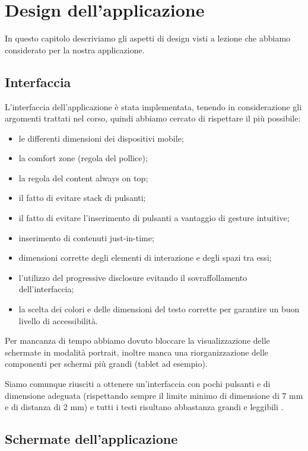 \chapter{Design dell'applicazione\label{sec:design}}

In questo capitolo descriviamo gli aspetti di design visti a lezione che abbiamo considerato per la nostra applicazione.

\section{Interfaccia\label{sec:interfaccia}}
L'interfaccia dell'applicazione è stata implementata, tenendo in considerazione gli argomenti trattati nel corso, quindi abbiamo cercato di rispettare il più possibile:
\begin{itemize}
    \item le differenti dimensioni dei dispositivi mobile;
    \item la comfort zone (regola del pollice);
    \item la regola del content always on top;
    \item il fatto di evitare stack di pulsanti;
    \item il fatto di evitare l'inserimento di pulsanti a vantaggio di gesture intuitive;
    \item inserimento di contenuti just-in-time;
    \item dimensioni corrette degli elementi di interazione e degli spazi tra essi;
    \item l'utilizzo del progressive disclosure evitando il sovraffollamento dell'interfaccia;
    \item la scelta dei colori e delle dimensioni del testo corrette per garantire un buon livello di accessibilità.
\end{itemize}

Per mancanza di tempo abbiamo dovuto bloccare la visualizzazione delle schermate in modalità portrait, inoltre manca una riorganizzazione delle componenti per schermi più grandi (tablet ad esempio).

Siamo comunque riusciti a ottenere un'interfaccia con pochi pulsanti e di dimensione adeguata (rispettando sempre il limite minimo di dimensione di 7 mm e di distanza di 2 mm) e tutti i testi risultano abbastanza grandi e leggibili \parencite{gaggi:mobileDesign}.

\section{Schermate dell'applicazione\label{sec:schermate}}

